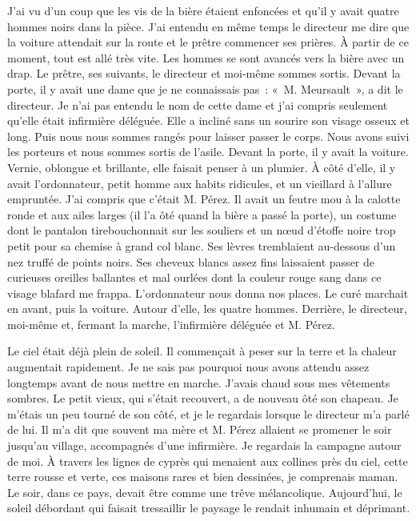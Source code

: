 \documentclass[french,twoside]{book} %
\begin{document}
J'ai vu d’un coup que les vis de la bière étaient enfoncées et qu’il y avait quatre hommes noirs dans la pièce. J'ai entendu en même temps le directeur me dire que la voiture attendait sur la route et le prêtre commencer ses prières. À partir de ce moment, tout est allé très vite. Les hommes se sont avancés vers la bière avec un drap. Le prêtre, ses suivants, le directeur et moi-même sommes sortis. Devant la porte, il y avait une dame que je ne connaissais pas : « M. Meursault », a dit le directeur. Je n’ai pas entendu le nom de cette dame et j’ai compris seulement qu’elle était infirmière déléguée. Elle a incliné sans un sourire son visage osseux et long. Puis nous nous sommes rangés pour laisser passer le corps. Nous avons suivi les porteurs et nous sommes sortis de l’asile. Devant la porte, il y avait la voiture. Vernie, oblongue et brillante, elle faisait penser à un plumier. À côté d’elle, il y avait l’ordonnateur, petit homme aux habits ridicules, et un vieillard à l’allure empruntée. J'ai compris que c’était M. Pérez. Il avait un feutre mou à la calotte ronde et aux ailes larges (il l’a ôté quand la bière a passé la porte), un costume dont le pantalon tirebouchonnait sur les souliers et un nœud d’étoffe noire trop petit pour sa chemise à grand col blanc. Ses lèvres tremblaient au-dessous d’un nez truffé de points noirs. Ses cheveux blancs assez fins laissaient passer de curieuses oreilles ballantes et mal ourlées dont la couleur rouge sang dans ce visage blafard me frappa. L'ordonnateur nous donna nos places. Le curé marchait en avant, puis la voiture. Autour d’elle, les quatre hommes. Derrière, le directeur, moi-même et, fermant la marche, l’infirmière déléguée et M. Pérez.\par
Le ciel était déjà plein de soleil. Il commençait à peser sur la terre et la chaleur augmentait rapidement. Je ne sais pas pourquoi nous avons attendu assez longtemps avant de nous mettre en marche. J'avais chaud sous mes vêtements sombres. Le petit vieux, qui s’était recouvert, a de nouveau ôté son chapeau. Je m’étais un peu tourné de son côté, et je le regardais lorsque le directeur m’a parlé de lui. Il m’a dit que souvent ma mère et M. Pérez allaient se promener le soir jusqu’au village, accompagnés d’une infirmière. Je regardais la campagne autour de moi. À travers les lignes de cyprès qui menaient aux collines près du ciel, cette terre rousse et verte, ces maisons rares et bien dessinées, je comprenais maman. Le soir, dans ce pays, devait être comme une trêve mélancolique. Aujourd’hui, le soleil débordant qui faisait tressaillir le paysage le rendait inhumain et déprimant.\par
\end{document}
